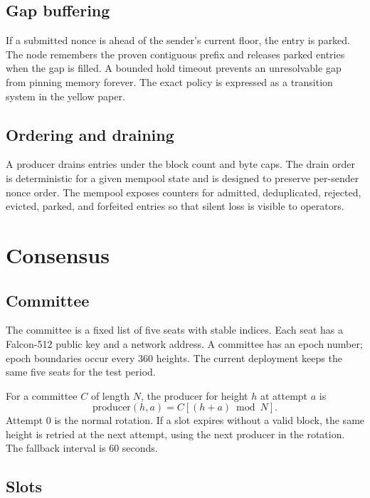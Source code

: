 \documentclass[11pt,a4paper]{article}
\begin{document}
\subsection{Gap buffering}

If a submitted nonce is ahead of the sender's current floor, the entry is
parked. The node remembers the proven contiguous prefix and releases parked
entries when the gap is filled. A bounded hold timeout prevents an
unresolvable gap from pinning memory forever. The exact policy is expressed as
a transition system in the yellow paper.

\subsection{Ordering and draining}

A producer drains entries under the block count and byte caps. The drain order
is deterministic for a given mempool state and is designed to preserve
per-sender nonce order. The mempool exposes counters for admitted,
deduplicated, rejected, evicted, parked, and forfeited entries so that silent
loss is visible to operators.

\section{Consensus}

\subsection{Committee}

The committee is a fixed list of five seats with stable indices. Each seat has
a Falcon-512 public key and a network address. A committee has an epoch
number; epoch boundaries occur every 360 heights. The current deployment keeps
the same five seats for the test period.

For a committee $C$ of length $N$, the producer for height $h$ at attempt $a$
is
\begin{equation}
  \mathrm{producer}(h,a) = C[(h+a) \bmod N].
\end{equation}
Attempt 0 is the normal rotation. If a slot expires without a valid block, the
same height is retried at the next attempt, using the next producer in the
rotation. The fallback interval is 60 seconds.

\subsection{Slots}
\end{document}
